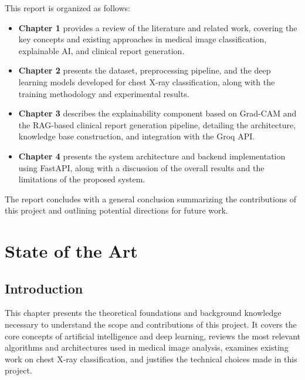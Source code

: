 \documentclass[12pt]{report}
\begin{document}
\bigskip
\noindent This report is organized as follows:

\begin{itemize}
    \item \textbf{Chapter 1} provides a review of the literature and
    related work, covering the key concepts and existing approaches in
    medical image classification, explainable AI, and clinical report
    generation.

    \item \textbf{Chapter 2} presents the dataset, preprocessing
    pipeline, and the deep learning models developed for chest X-ray
    classification, along with the training methodology and experimental
    results.

    \item \textbf{Chapter 3} describes the explainability component
    based on Grad-CAM and the RAG-based clinical report generation
    pipeline, detailing the architecture, knowledge base construction,
    and integration with the Groq API.

    \item \textbf{Chapter 4} presents the system architecture and
    backend implementation using FastAPI, along with a discussion of
    the overall results and the limitations of the proposed system.
\end{itemize}

\bigskip
\noindent The report concludes with a general conclusion summarizing
the contributions of this project and outlining potential directions
for future work.

\chapter{State of the Art}

\section{Introduction}
This chapter presents the theoretical foundations and background knowledge
necessary to understand the scope and contributions of this project. It
covers the core concepts of artificial intelligence and deep learning,
reviews the most relevant algorithms and architectures used in medical
image analysis, examines existing work on chest X-ray classification, and
justifies the technical choices made in this project.

\end{document}

